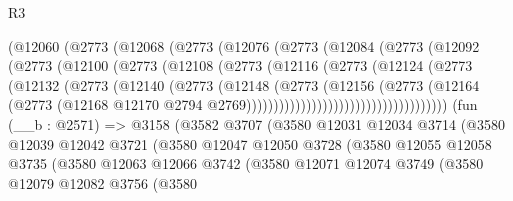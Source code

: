 \begin{lexlean}{R3}
\begin{coremodule}
                    (@12060
                      (@2773
                        (@12068
                          (@2773
                            (@12076
                              (@2773
                                (@12084
                                  (@2773
                                    (@12092
                                      (@2773
                                        (@12100
                                          (@2773
                                            (@12108
                                              (@2773
                                                (@12116
                                                  (@2773
                                                    (@12124
                                                      (@2773
                                                        (@12132
                                                          (@2773
                                                            (@12140
                                                              (@2773
                                                                (@12148
                                                                  (@2773
                                                                    (@12156
                                                                      (@2773
                                                                        (@12164
                                                                          (@2773
                                                                            (@12168
                                                                              @12170
                                                                              @2794
                                                                              @2769)))))))))))))))))))))))))))))))))))))
    (fun (__b : @2571) =>
    @3158
      (@3582
        @3707
        (@3580
          @12031
          @12034
          @3714
          (@3580
            @12039
            @12042
            @3721
            (@3580
              @12047
              @12050
              @3728
              (@3580
                @12055
                @12058
                @3735
                (@3580
                  @12063
                  @12066
                  @3742
                  (@3580
                    @12071
                    @12074
                    @3749
                    (@3580
                      @12079
                      @12082
                      @3756
                      (@3580

\end{coremodule}
\end{lexlean}
